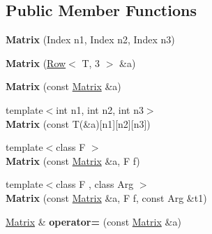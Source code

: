 \subsection*{Public Member Functions}
\begin{DoxyCompactItemize}
\item 
{\bfseries Matrix} (Index n1, Index n2, Index n3)\hypertarget{classcpt_1_1Matrix_3_01T_00_013_01_4_a51a65893c974b66855ec5d186be526f7}{}\label{classcpt_1_1Matrix_3_01T_00_013_01_4_a51a65893c974b66855ec5d186be526f7}

\item 
{\bfseries Matrix} (\hyperlink{classcpt_1_1Row}{Row}$<$ T, 3 $>$ \&a)\hypertarget{classcpt_1_1Matrix_3_01T_00_013_01_4_a62e8a38442a0c3a097c0e285426f4483}{}\label{classcpt_1_1Matrix_3_01T_00_013_01_4_a62e8a38442a0c3a097c0e285426f4483}

\item 
{\bfseries Matrix} (const \hyperlink{classcpt_1_1Matrix}{Matrix} \&a)\hypertarget{classcpt_1_1Matrix_3_01T_00_013_01_4_aeb9cc435ba4e411dcaa1800e58e7121a}{}\label{classcpt_1_1Matrix_3_01T_00_013_01_4_aeb9cc435ba4e411dcaa1800e58e7121a}

\item 
{\footnotesize template$<$int n1, int n2, int n3$>$ }\\{\bfseries Matrix} (const T(\&a)\mbox{[}n1\mbox{]}\mbox{[}n2\mbox{]}\mbox{[}n3\mbox{]})\hypertarget{classcpt_1_1Matrix_3_01T_00_013_01_4_a398a430de61477c737b362a765256674}{}\label{classcpt_1_1Matrix_3_01T_00_013_01_4_a398a430de61477c737b362a765256674}

\item 
{\footnotesize template$<$class F $>$ }\\{\bfseries Matrix} (const \hyperlink{classcpt_1_1Matrix}{Matrix} \&a, F f)\hypertarget{classcpt_1_1Matrix_3_01T_00_013_01_4_a1e869a6286e9fe12b82ce9236e0cb903}{}\label{classcpt_1_1Matrix_3_01T_00_013_01_4_a1e869a6286e9fe12b82ce9236e0cb903}

\item 
{\footnotesize template$<$class F , class Arg $>$ }\\{\bfseries Matrix} (const \hyperlink{classcpt_1_1Matrix}{Matrix} \&a, F f, const Arg \&t1)\hypertarget{classcpt_1_1Matrix_3_01T_00_013_01_4_af3a289af995734958cae4e8d153d5550}{}\label{classcpt_1_1Matrix_3_01T_00_013_01_4_af3a289af995734958cae4e8d153d5550}

\item 
\hyperlink{classcpt_1_1Matrix}{Matrix} \& {\bfseries operator=} (const \hyperlink{classcpt_1_1Matrix}{Matrix} \&a)\hypertarget{classcpt_1_1Matrix_3_01T_00_013_01_4_a95f05e42faff3575e9c40086030eb16a}{}\label{classcpt_1_1Matrix_3_01T_00_013_01_4_a95f05e42faff3575e9c40086030eb16a}


\end{DoxyCompactItemize}
